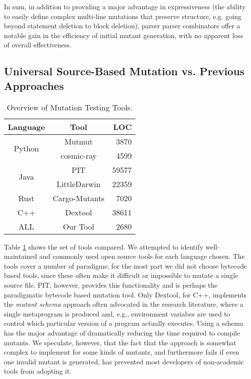\documentclass[sigconf,review, anonymous]{acmart}
\begin{document}
{In sum, in addition to providing a major advantage in expressiveness
(the ability to easily define complex multi-line mutations that
preserve structure, e.g. going beyond statement deletion to block
deletion), parser parser combinators offer a notable gain in the
efficiency of initial mutant generation, with no apparent loss of overall effectiveness.

\subsection{Universal Source-Based Mutation vs. Previous Approaches}


\begin{table}[hbtp]
  \centering
  \caption{Overview of Mutation Testing Tools.}
  \label{tab:mutationtools}
  
  \begin{tabular}{|c|c|r|}
  \hline
  \textbf{Language} & \textbf{Tool} & \textbf{LOC}  \\
  \hline
  \multirow{2}{*}{Python}  & Mutmut &	3870  \\\cline{2-3}
      & cosmic-ray & 4599 \\ \hline
  \multirow{2}{*}{Java}  & PIT &	59577  \\\cline{2-3}
      & LittleDarwin & 22359 \\ \hline
      Rust & Cargo-Mutants & 7020 \\\hline
    C++ & Dextool & 38611 \\\hline
    \hline
      ALL & Our Tool & 2680 \\\hline
  \end{tabular}
\end{table}

Table \ref{tab:mutationtools} shows the set of tools compared.  We
attempted to identify well-maintained and commonly used open
source tools for each
language chosen.  The tools cover a number of paradigms; for the most
part we did not choose bytecode based tools, since these often make it
difficult or impossible to mutate a single source file.  PIT, however,
provides this functionality and is perhaps the paradigmatic bytecode
based mutation tool.  Only Dextool, for C++, implements the
\emph{mutant schema} \cite{untch1993mutation} approach often advocated
in the research literature, where a single metaprogram is produced
and, e.g., environment variabes are used to control which particular
version of a program actually executes.  Using a schema has the major
advantage of dramatically reducing the time required to compile
mutants.  We speculate, however, that the fact that the approach is
somewhat complex to implement for some kinds of mutants, and
furthermore fails if even one invalid mutant is generated, has
prevented most developers of non-academic tools from adopting it.

}
\end{document}
